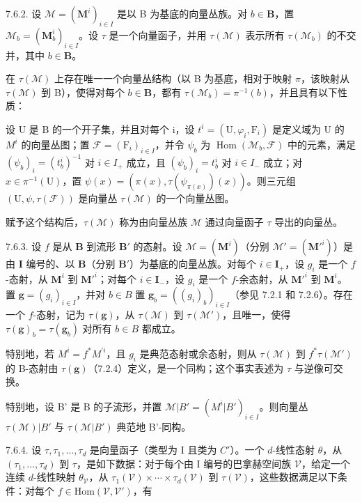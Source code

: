 7.6.2. 设 \(\mathcal{M} = (\mathbf{M}^i)_{i\in I}\) 是以 B 为基底的向量丛族。对 \(b\in \mathbf{B}\)，置 \(\mathcal{M}_b = (\mathbf{M}_b^i)_{i\in I}\)。设 \(\tau\) 是一个向量函子，并用 \(\tau (\mathcal{M})\) 表示所有 \(\tau(\mathcal{M}_{b})\) 的不交并，其中 \(b\in\mathbf{B}\)。

在 \(\tau(\mathcal{M})\) 上存在唯一一个向量丛结构（以 B 为基底，相对于映射 \(\pi\)，该映射从 \(\tau(\mathcal{M})\) 到 B），使得对每个 \(b\in\mathbf{B}\)，都有 \(\tau(\mathcal{M}_{b})=\pi^{-1}(b)\)，并且具有以下性质：

设 U 是 B 的一个开子集，并且对每个 i，设 \(t^{i} = (\mathrm{U}, \varphi_{i}, \mathrm{F}_{i})\) 是定义域为 U 的 \(M^{i}\) 的向量丛图；置 \(\mathcal{F} = (\mathrm{F}_{i})_{i \in I}\)，并令 \(\psi_{b}\) 为 \(\operatorname{Hom}(\mathcal{M}_{b}, \mathcal{F})\) 中的元素，满足 \((\psi_{b})_{i} = (t_{b}^{i})^{-1}\) 对 \(i \in I_{+}\) 成立，且 \((\psi_{b})_{i} = t_{b}^{i}\) 对 \(i \in I_{-}\) 成立；对 \(x \in \pi^{-1}(\mathrm{U})\)，置 \(\psi(x) = (\pi(x), \tau(\psi_{\pi(x)})(x))\)。则三元组 \((\mathrm{U}, \psi, \tau(\mathcal{F}))\) 是向量丛 \(\tau(\mathcal{M})\) 的一个向量丛图。

赋予这个结构后，\(\tau(\mathcal{M})\) 称为由向量丛族 \(\mathcal{M}\) 通过向量函子 \(\tau\) 导出的向量丛。

7.6.3. 设 \(f\) 是从 \(\mathbf{B}\) 到流形 \(\mathbf{B}'\) 的态射。设 \(\mathcal{M} = (\mathbf{M}^i)\)（分别 \(\mathcal{M}' = (\mathbf{M}'^i)\)）是由 \(\mathbf{I}\) 编号的、以 \(\mathbf{B}\)（分别 \(\mathbf{B}'\)）为基底的向量丛族。对每个 \(i \in \mathbf{I}_+\)，设 \(g_i\) 是一个 \(f\)-态射，从 \(\mathbf{M}^i\) 到 \(\mathbf{M}'^i\)；对每个 \(i \in \mathbf{I}_-\)，设 \(g_i\) 是一个 \(f\)-余态射，从 \(\mathbf{M}'^i\) 到 \(\mathbf{M}^i\)。置 \(\mathbf{g} = (g_i)_{i \in I}\)，并对 \(b \in B\) 置 \(\mathbf{g}_b = ((g_i)_b)_{i \in I}\)（参见 7.2.1 和 7.2.6）。存在一个 \(f\)-态射，记为 \(\tau(\mathbf{g})\)，从 \(\tau(\mathcal{M})\) 到 \(\tau(\mathcal{M}')\)，且唯一，使得 \(\tau(\mathbf{g})_b = \tau(\mathbf{g}_b)\) 对所有 \(b \in B\) 都成立。

特别地，若 \(M^{i}=f^{*}M^{'i}\)，且 \(g_{i}\) 是典范态射或余态射，则从 \(\tau(\mathcal{M})\) 到 \(f^{*}\tau(\mathcal{M}')\) 的 B-态射由 \(\tau(\mathbf{g})\)（7.2.4）定义，是一个同构；这个事实表述为 \(\tau\) 与逆像可交换。

特别地，设 B' 是 B 的子流形，并置 \(\mathcal{M}|B' = (M^{i}|B')_{i\in I}\)。则向量丛 \(\tau(\mathcal{M})|B'\) 与 \(\tau(\mathcal{M}|B')\) 典范地 B'-同构。

7.6.4. 设 \(\tau, \tau_1, \ldots, \tau_d\) 是向量函子（类型为 I 且类为 \(C'\)）。一个 \(d\)-线性态射 \(\theta\)，从 \((\tau_1, \ldots, \tau_d)\) 到 \(\tau\)，是如下数据：对于每个由 I 编号的巴拿赫空间族 \(\mathcal{V}\)，给定一个连续 \(d\)-线性映射 \(\theta_{\mathcal{V}}\)，从 \(\tau_1(\mathcal{V}) \times \cdots \times \tau_d(\mathcal{V})\) 到 \(\tau(\mathcal{V})\)，这些数据满足以下条件：对每个 \(f \in \text{Hom}(\mathcal{V}, \mathcal{V}')\)，有

